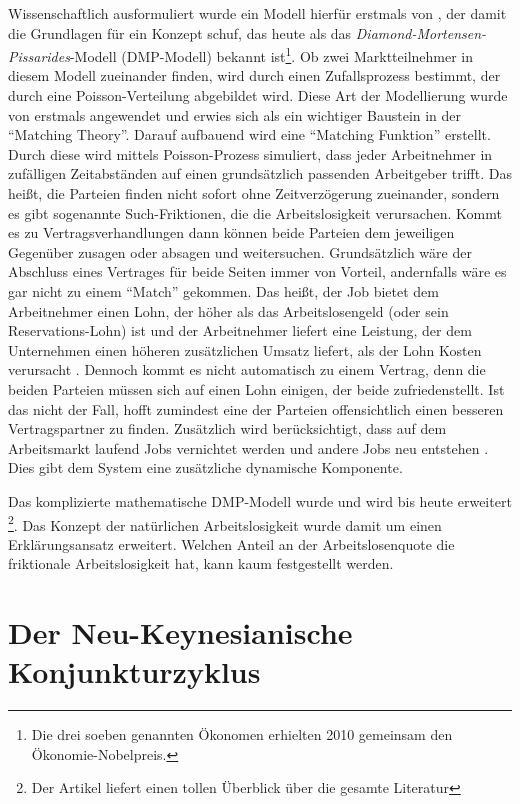 Wissenschaftlich ausformuliert wurde ein Modell hierfür erstmals von \textcite{Diamond1982}, der damit die Grundlagen für ein Konzept schuf, das heute als das \textit{Diamond-Mortensen-Pissarides}-Modell (DMP-Modell) bekannt ist\footnote{Die drei soeben genannten Ökonomen erhielten 2010 gemeinsam den Ökonomie-Nobelpreis.}. Ob zwei Marktteilnehmer in diesem Modell zueinander finden, wird durch einen Zufallsprozess bestimmt, der durch eine Poisson-Verteilung abgebildet wird. Diese Art der Modellierung wurde von \textcite{Mortensen1978} erstmals angewendet und erwies sich als ein wichtiger Baustein in der "`Matching Theory"'. Darauf aufbauend wird eine "`Matching Funktion"' erstellt. Durch diese wird mittels Poisson-Prozess simuliert, dass jeder Arbeitnehmer in zufälligen Zeitabständen auf einen grundsätzlich passenden Arbeitgeber trifft. Das heißt, die Parteien finden nicht sofort ohne Zeitverzögerung zueinander, sondern es gibt sogenannte Such-Friktionen, die die Arbeitslosigkeit verursachen. Kommt es zu Vertragsverhandlungen dann können beide Parteien dem jeweiligen Gegenüber zusagen oder absagen und weitersuchen. Grundsätzlich wäre der Abschluss eines Vertrages für beide Seiten immer von Vorteil, andernfalls wäre es gar nicht zu einem "`Match"' gekommen. Das heißt, der Job bietet dem Arbeitnehmer einen Lohn, der höher als das Arbeitslosengeld (oder sein Reservations-Lohn) ist und der Arbeitnehmer liefert eine Leistung, der dem Unternehmen einen höheren zusätzlichen Umsatz liefert, als der Lohn Kosten verursacht \parencite{Pissarides1985}. Dennoch kommt es nicht automatisch zu einem Vertrag, denn die beiden Parteien müssen sich auf einen Lohn einigen, der beide zufriedenstellt. Ist das nicht der Fall, hofft zumindest eine der Parteien offensichtlich einen besseren Vertragspartner zu finden. Zusätzlich wird berücksichtigt, dass auf dem Arbeitsmarkt laufend Jobs vernichtet werden und andere Jobs neu entstehen \parencite{MortensenPissarides1994}. Dies gibt dem System eine zusätzliche dynamische Komponente. 

Das komplizierte mathematische DMP-Modell wurde und wird bis heute erweitert \parencite{Rogerson2005}\footnote{Der Artikel liefert einen tollen Überblick über die gesamte Literatur}. Das Konzept der natürlichen Arbeitslosigkeit wurde damit um einen Erklärungsansatz erweitert. Welchen Anteil an der Arbeitslosenquote die friktionale Arbeitslosigkeit hat, kann kaum festgestellt werden.


\section{Der Neu-Keynesianische Konjunkturzyklus}
\label{NK_BusinessCycle}

